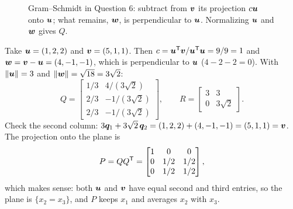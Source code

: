 \begin{figure}[ht]\centering
{}
\caption{Gram--Schmidt in Question 6: subtract from $\boldsymbol{v}$ its projection $c\boldsymbol{u}$ onto $\boldsymbol{u}$; what remains, $\boldsymbol{w}$, is perpendicular to $\boldsymbol{u}$. Normalizing $\boldsymbol{u}$ and $\boldsymbol{w}$ gives $Q$.}\label{fig:u40-gs}
\end{figure}

\begin{example}\label{ex:u40-qr}
Take $\boldsymbol{u}=(1,2,2)$ and $\boldsymbol{v}=(5,1,1)$. Then $c=\boldsymbol{u}^{\mathsf{T}}\boldsymbol{v}/\boldsymbol{u}^{\mathsf{T}}\boldsymbol{u}=9/9=1$ and $\boldsymbol{w}=\boldsymbol{v}-\boldsymbol{u}=(4,-1,-1)$, which is perpendicular to $\boldsymbol{u}$ ($4-2-2=0$). With $\|\boldsymbol{u}\|=3$ and $\|\boldsymbol{w}\|=\sqrt{18}=3\sqrt2$:
\[
Q=\begin{bmatrix}1/3&4/(3\sqrt2)\\2/3&-1/(3\sqrt2)\\2/3&-1/(3\sqrt2)\end{bmatrix},\qquad R=\begin{bmatrix}3&3\\0&3\sqrt2\end{bmatrix}.
\]
Check the second column: $3\boldsymbol{q}_1+3\sqrt2\,\boldsymbol{q}_2=(1,2,2)+(4,-1,-1)=(5,1,1)=\boldsymbol{v}$. The projection onto the plane is
\[
P=QQ^{\mathsf{T}}=\begin{bmatrix}1&0&0\\0&1/2&1/2\\0&1/2&1/2\end{bmatrix},
\]
which makes sense: both $\boldsymbol{u}$ and $\boldsymbol{v}$ have equal second and third entries, so the plane is $\{x_2=x_3\}$, and $P$ keeps $x_1$ and averages $x_2$ with $x_3$.
\end{example}

